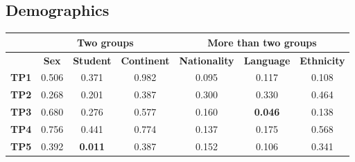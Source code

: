 \subsection{Demographics}
\label{sec:results-demographics}
\begin{table}
    \small
    \centering
    \begin{tabular}{lccc|ccc}
        \toprule
                      & \multicolumn{3}{c}{\textbf{Two groups}} & \multicolumn{3}{c}{\textbf{More than two groups}}                                                                                                                                                                       \\
        \midrule
                      & \multicolumn{1}{c}{\textbf{Sex}}        & \multicolumn{1}{c}{\textbf{Student}}              & \multicolumn{1}{c}{\textbf{Continent}} & \multicolumn{1}{c}{\textbf{Nationality}} & \multicolumn{1}{c}{\textbf{Language}}  & \multicolumn{1}{c}{\textbf{Ethnicity}} \\
        \midrule
        \textbf{TP1}  & 0.506                                   & 0.371                                             & 0.982                                  & 0.095                                    & 0.117                                  & 0.108                                  \\
        \textbf{TP2}  & 0.268                                   & 0.201                                             & 0.387                                  & 0.300                                    & 0.330                                  & 0.464                                  \\
        \textbf{TP3}  & 0.680                                   & 0.276                                             & 0.577                                  & 0.160                                    & \cellcolor[HTML]{EFEFEF}\textbf{0.046} & 0.138                                  \\
        \textbf{TP4}  & 0.756                                   & 0.441                                             & 0.774                                  & 0.137                                    & 0.175                                  & 0.568                                  \\
        \textbf{TP5}  & 0.392                                   & \cellcolor[HTML]{EFEFEF}\textbf{0.011}            & 0.387                                  & 0.152                                    & 0.106                                  & 0.341                                  \\

\end{tabular}
\end{table}
